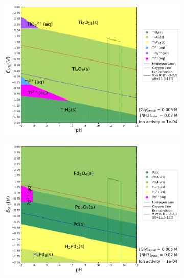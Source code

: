 \documentclass[journal=jacsat,manuscript=article]{achemso}
\begin{document}
\begin{figure}[htbp]
\begin{subfigure}[b]{0.3\textwidth}
        \par\medskip   
    \end{subfigure}
    \begin{subfigure}[b]{0.3\textwidth}
        \includegraphics[width=\textwidth]{Figures/pourbaix_diagrams/Ti-NH3-H2O_activity=1e-04_[NH3]=0.02M_[Gly]=0.005M_[CN]=0.png}
        \subcaption{}\label{fig:Ti_Pourbaix_NH3_Gly}
    \end{subfigure}
    \begin{subfigure}[b]{0.3\textwidth}
        \includegraphics[width=\textwidth]{Figures/pourbaix_diagrams/Pd-NH3-H2O_activity=1e-04_[NH3]=0.02M_[Gly]=0.005M_[CN]=0.png}
        \subcaption{}\label{fig:Pd_Pourbaix_NH3_Gly}
    \end{subfigure}

\end{figure}
\end{document}
